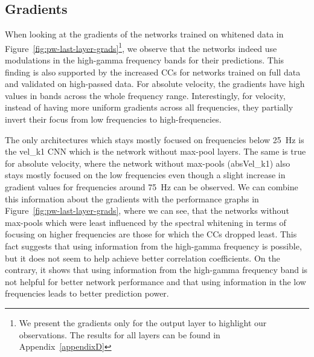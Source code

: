 \subsection{Gradients}\label{subsec:pw-gradients2}
When looking at the gradients of the networks trained on whitened data in Figure~\ref{fig:pw-last-layer-grads}\footnote{We present the gradients only for the output layer to highlight our observations. 
The results for all layers can be found in Appendix~\ref{appendixD}}, we observe that the networks indeed use modulations in the high-gamma frequency bands for their predictions. 
This finding is also supported by the increased CCs for networks trained on full data and validated on high-passed data.
For absolute velocity, the gradients have high values in bands across the whole frequency range. Interestingly, for velocity, instead of having more uniform gradients across all frequencies, they partially invert their focus from low frequencies to high-frequencies.

The only architectures which stays mostly focused on frequencies below 25~Hz is the vel\_k1 CNN which is the network without max-pool layers.
The same is true for absolute velocity, where the network without max-pools (absVel\_k1) also stays mostly focused on the low frequencies even though a slight increase in gradient values for frequencies around 75~Hz can be observed. 
We can combine this information about the gradients with the performance graphs in Figure~\ref{fig:pw-last-layer-grads}, where we can see, that the networks without max-pools which were least influenced by the spectral whitening in terms of focusing on higher frequencies are those for which the CCs dropped least.
This fact suggests that using information from the high-gamma frequency is possible, but it does not seem to help achieve better correlation coefficients. 
On the contrary, it shows that using information from the high-gamma frequency band is not helpful for better network performance and that using information in the low frequencies leads to better prediction power.

